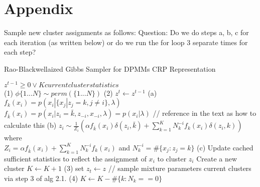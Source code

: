 \section{Appendix}

Sample new cluster assignments as follows:
Question: Do we do steps a, b, c for each iteration (as written below) or do we run the for loop 3 separate times for each step?
\begin{algorithm}
\caption{Rao-Blackwellaized Gibbs Sampler for DPMMs CRP Representation \cite{Sudderth:aa}}
\begin{algorithmic} 
\REQUIRE $z^{t-1} \geq 0 \vee K current cluster statistics$ \\
\STATE (1) $\phi\{1...N\} \sim perm(\{1...N\})$
\STATE (2) $z^{t} \leftarrow z^{t-1} $
\STATE (a)
\STATE $f_{k}(x_i) = p(x_i | \{x_j | z_j = k, j \neq i\}, \lambda)$ 
\ENDFOR
\STATE $f_{\bar{k}}(x_i) = p(x_i | z_i = \bar{k}, z_{-i}, x_{-i}, \lambda) = p(x_i | \lambda)$ // reference in the text as how to calculate this
\STATE (b) $z_i \sim \frac{1}{Z_i} (  \alpha f_{\bar{k}}(x_i) \delta(z_i, \bar{k}) + \sum_{k=1}^K N_k^{-i}  f_k(x_i) \delta(z_i, k) ) $ where \\
$ Z_i = \alpha f_{\bar{k}}(x_i) + \sum_{k=1}^K N_k^{-i} f_k(x_i)  $ and $ N_k^{-i} = \# \{x_j : z_j = k\} $
\STATE (c) Update cached sufficient statistics to reflect the assignment of $x_i$ to cluster $z_i$
\STATE Create a new cluster
\STATE $K \leftarrow K + 1$
\ENDIF 
\ENDFOR 
\STATE (3) set $ z_t \leftarrow z$ // sample mixture parameters current clusters via step 3 of alg 2.1. \cite{Sudderth:aa}
\STATE (4) $K \leftarrow K - \#\{ k : N_k == 0 \} $
\end{algorithmic}
\end{algorithm}